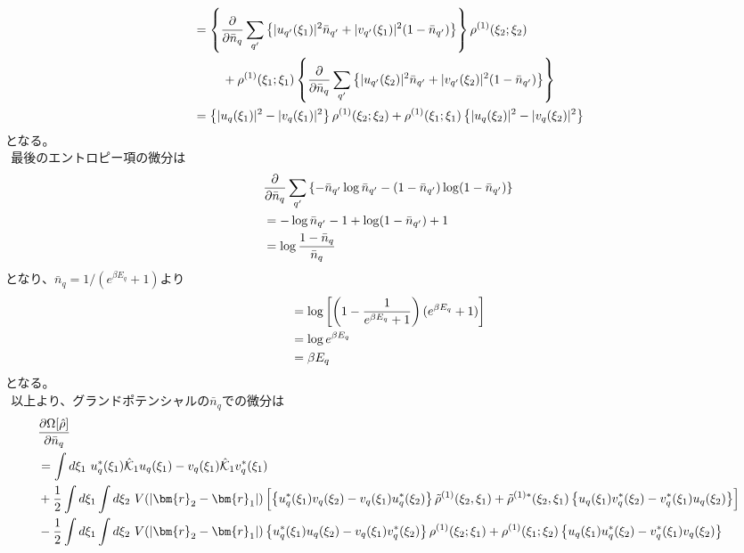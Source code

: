 \documentclass[dvipdfmx, 11pt, a4paper]{jsarticle}
\numberwithin{equation}{section}
\theoremstyle{definition}
\begin{document}
\begin{derivationBox}
\begin{align}
            &= \left\{ \frac{\partial}{\partial  \bar{n}_q}\sum_{q'}\left\{ |u_{q'}(\xi_1)|^2\bar{n}_{q'}+|v_{q'}(\xi_1)|^2 (1-\bar{n}_{q'}) \right\}\right\}\rho^{(1)}(\xi_2;\xi_2) \notag \\
            &\ \ \ \ \ \ \ + \rho^{(1)}(\xi_1;\xi_1)\left\{ \frac{\partial}{\partial  \bar{n}_q}\sum_{q'}\left\{ |u_{q'}(\xi_2)|^2\bar{n}_{q'}+|v_{q'}(\xi_2)|^2(1-\bar{n}_{q'}) \right\} \right\} \notag \\
            &= \left\{  |u_q(\xi_1)|^2-|v_q(\xi_1)|^2 \right\}\rho^{(1)}(\xi_2;\xi_2) + \rho^{(1)}(\xi_1;\xi_1)\left\{  |u_q(\xi_2)|^2-|v_q(\xi_2)|^2 \right\}
        \end{align}
        となる。\\
        $\ \ $最後のエントロピー項の微分は
        \begin{align}
            &\frac{\partial}{\partial \bar{n}_q} \sum_{q'}\left\{ -\bar{n}_{q'}\log \bar{n}_{q'} - (1-\bar{n}_{q'})\log(1-\bar{n}_{q'}) \right\} \notag \\
            &= -\log \bar{n}_{q'} - 1 +\log(1-\bar{n}_{q'}) + 1 \notag \\
            &= \log \frac{1-\bar{n}_q}{\bar{n}_q}
        \end{align}
        となり、$\bar{n}_q = 1/(e^{\beta E_q}+1)$より
        \begin{align}
            &= \log \left[ \left( 1- \frac{1}{e^{\beta E_q}+1}\right) (e^{\beta E_q}+1)\right] \notag \\
            &= \log e^{\beta E_q} \notag \\
            &= \beta E_q
        \end{align}
        となる。\\
        $\ \ $以上より、グランドポテンシャルの$\bar{n}_q$での微分は
        \begin{align}
            &\frac{\partial \Omega[\hat{\rho}]}{\partial \bar{n}_q} \notag \\
            &= \int d\xi_1\ u_{q}^*(\xi_1)\hat{\mathcal{K}}_1  u_{q}(\xi_1)-v_{q}(\xi_1) \hat{\mathcal{K}}_1 v_{q}^*(\xi_1) \notag \\
            &+ \frac{1}{2} \int d\xi_1 \int d\xi_2\ V(\left| \bm{r}_2-\bm{r}_1 \right|)\left[ \left\{ u_q^*(\xi_1) v_q(\xi_2) - v_q(\xi_1) u_q^*(\xi_2)\right\} \tilde{\rho}^{(1)}(\xi_2,\xi_1) +  \tilde{\rho}^{(1)*}(\xi_2,\xi_1)\left\{   u_q(\xi_1)v^*_q(\xi_2) - v^*_q(\xi_1)u_q(\xi_2)   \right\} \right] \notag \\
            &-  \frac{1}{2} \int d\xi_1 \int d\xi_2\ V(\left| \bm{r}_2-\bm{r}_1 \right|) \left\{ u_{q}^*(\xi_1)u_{q}(\xi_2)-v_{q}(\xi_1)v_{q}^*(\xi_2) \right\} \rho^{(1)}(\xi_2;\xi_1) +  \rho^{(1)}(\xi_1;\xi_2)  \left\{ u_{q}(\xi_1)u_{q}^*(\xi_2)-v_{q}^*(\xi_1)v_{q}(\xi_2)\right\}  \notag \\

\end{align}
\end{derivationBox}
\end{document}
